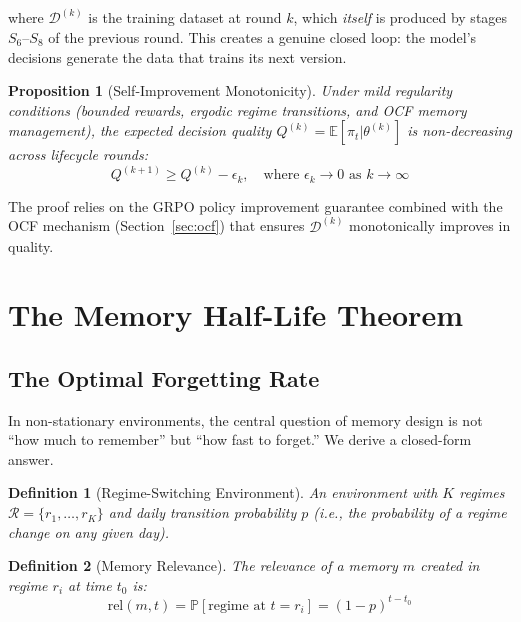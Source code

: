 \documentclass[11pt, a4paper]{article}
\newtheorem{definition}{Definition}
\newtheorem{proposition}{Proposition}
\begin{document}
where $\mathcal{D}^{(k)}$ is the training dataset at round $k$, which \emph{itself} is produced by stages $S_6$--$S_8$ of the previous round. This creates a genuine closed loop: the model's decisions generate the data that trains its next version.

\begin{proposition}[Self-Improvement Monotonicity]
Under mild regularity conditions (bounded rewards, ergodic regime transitions, and OCF memory management), the expected decision quality $Q^{(k)} = \mathbb{E}[\pi_t | \theta^{(k)}]$ is non-decreasing across lifecycle rounds:
\begin{equation}
  Q^{(k+1)} \geq Q^{(k)} - \epsilon_k, \quad \text{where } \epsilon_k \to 0 \text{ as } k \to \infty
\end{equation}
\end{proposition}

The proof relies on the GRPO policy improvement guarantee combined with the OCF mechanism (Section~\ref{sec:ocf}) that ensures $\mathcal{D}^{(k)}$ monotonically improves in quality.


\section{The Memory Half-Life Theorem}
\label{sec:halflife}

\subsection{The Optimal Forgetting Rate}

In non-stationary environments, the central question of memory design is not ``how much to remember'' but ``how fast to forget.'' We derive a closed-form answer.

\begin{definition}[Regime-Switching Environment]
An environment with $K$ regimes $\mathcal{R} = \{r_1, \ldots, r_K\}$ and daily transition probability $p$ (i.e., the probability of a regime change on any given day).
\end{definition}

\begin{definition}[Memory Relevance]
The relevance of a memory $m$ created in regime $r_i$ at time $t_0$ is:
\begin{equation}
  \text{rel}(m, t) = \mathbb{P}[\text{regime at } t = r_i] = (1-p)^{t - t_0}
\end{equation}
\end{definition}
\end{document}
